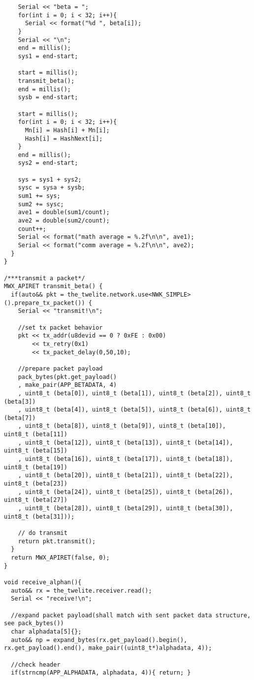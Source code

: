 \documentclass{thesis}
\begin{document}
\begin{lstlisting}
    Serial << "beta = ";
    for(int i = 0; i < 32; i++){
      Serial << format("%d ", beta[i]);
    }
    Serial << "\n";
    end = millis();
    sys1 = end-start;

    start = millis();
    transmit_beta();
    end = millis();
    sysb = end-start;

    start = millis();
    for(int i = 0; i < 32; i++){
      Mn[i] = Hash[i] + Mn[i];
      Hash[i] = HashNext[i];
    }
    end = millis();
    sys2 = end-start;

    sys = sys1 + sys2;
    sysc = sysa + sysb;
    sum1 += sys;
    sum2 += sysc;
    ave1 = double(sum1/count);
    ave2 = double(sum2/count);
    count++;
    Serial << format("math average = %.2f\n\n", ave1);
    Serial << format("comm average = %.2f\n\n", ave2);
  }
}

/***transmit a packet*/
MWX_APIRET transmit_beta() {
  if(auto&& pkt = the_twelite.network.use<NWK_SIMPLE>().prepare_tx_packet()) {
    Serial << "transmit!\n";

    //set tx packet behavior
    pkt << tx_addr(u8devid == 0 ? 0xFE : 0x00)
        << tx_retry(0x1)
        << tx_packet_delay(0,50,10);

    //prepare packet payload
    pack_bytes(pkt.get_payload()
    , make_pair(APP_BETADATA, 4)
    , uint8_t (beta[0]), uint8_t (beta[1]), uint8_t (beta[2]), uint8_t (beta[3])
    , uint8_t (beta[4]), uint8_t (beta[5]), uint8_t (beta[6]), uint8_t (beta[7])
    , uint8_t (beta[8]), uint8_t (beta[9]), uint8_t (beta[10]), uint8_t (beta[11])
    , uint8_t (beta[12]), uint8_t (beta[13]), uint8_t (beta[14]), uint8_t (beta[15])
    , uint8_t (beta[16]), uint8_t (beta[17]), uint8_t (beta[18]), uint8_t (beta[19])
    , uint8_t (beta[20]), uint8_t (beta[21]), uint8_t (beta[22]), uint8_t (beta[23])
    , uint8_t (beta[24]), uint8_t (beta[25]), uint8_t (beta[26]), uint8_t (beta[27])
    , uint8_t (beta[28]), uint8_t (beta[29]), uint8_t (beta[30]), uint8_t (beta[31]));

    // do transmit
    return pkt.transmit();
  }
  return MWX_APIRET(false, 0);
}

void receive_alphan(){
  auto&& rx = the_twelite.receiver.read();
  Serial << "receive!\n";

  //expand packet payload(shall match with sent packet data structure, see pack_bytes())
  char alphadata[5]{};
  auto&& np = expand_bytes(rx.get_payload().begin(), rx.get_payload().end(), make_pair((uint8_t*)alphadata, 4));

  //check header
  if(strncmp(APP_ALPHADATA, alphadata, 4)){ return; }


\end{lstlisting}
\end{document}
